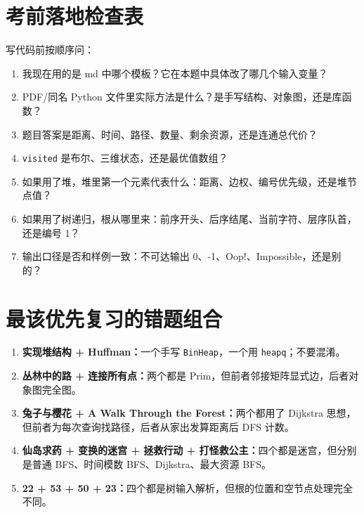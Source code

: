 \documentclass[10pt,a4paper,fontset=none]{ctexart}
\begin{document}
\section{考前落地检查表}
\begin{checklistbox}
写代码前按顺序问：
\begin{enumerate}
  \item 我现在用的是 md 中哪个模板？它在本题中具体改了哪几个输入变量？
  \item PDF/同名 Python 文件里实际方法是什么？是手写结构、对象图，还是库函数？
  \item 题目答案是距离、时间、路径、数量、剩余资源，还是连通总代价？
  \item \texttt{visited} 是布尔、三维状态，还是最优值数组？
  \item 如果用了堆，堆里第一个元素代表什么：距离、边权、编号优先级，还是堆节点值？
  \item 如果用了树递归，根从哪里来：前序开头、后序结尾、当前字符、层序队首，还是编号 1？
  \item 输出口径是否和样例一致：不可达输出 0、-1、Oop!、Impossible，还是别的？
\end{enumerate}
\end{checklistbox}

\section{最该优先复习的错题组合}
\begin{enumerate}
  \item \textbf{实现堆结构 + Huffman：}一个手写 \texttt{BinHeap}，一个用 \texttt{heapq}；不要混淆。
  \item \textbf{丛林中的路 + 连接所有点：}两个都是 Prim，但前者邻接矩阵显式边，后者对象图完全图。
  \item \textbf{兔子与樱花 + A Walk Through the Forest：}两个都用了 Dijkstra 思想，但前者为每次查询找路径，后者从家出发算距离后 DFS 计数。
  \item \textbf{仙岛求药 + 变换的迷宫 + 拯救行动 + 打怪救公主：}四个都是迷宫，但分别是普通 BFS、时间模数 BFS、Dijkstra、最大资源 BFS。
  \item \textbf{22 + 53 + 50 + 23：}四个都是树输入解析，但根的位置和空节点处理完全不同。
\end{enumerate}
\end{document}
